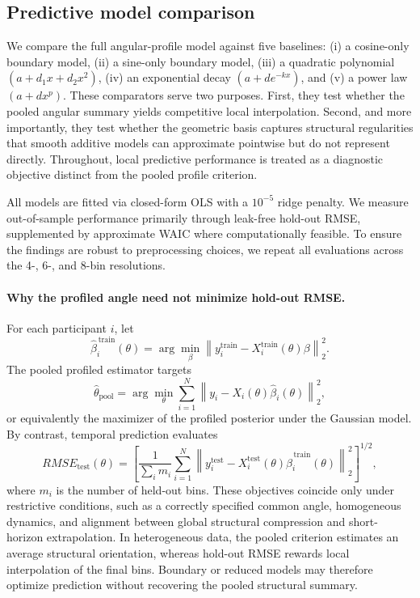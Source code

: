 \documentclass[12pt]{article}
\begin{document}
\subsection{Predictive model comparison}
We compare the full angular-profile model against five baselines: (i) a cosine-only boundary model, (ii) a sine-only boundary model, (iii) a quadratic polynomial $(a+d_1x+d_2x^2)$, (iv) an exponential decay $(a+de^{-kx})$, and (v) a power law $(a+dx^p)$. These comparators serve two purposes. First, they test whether the pooled angular summary yields competitive local interpolation. Second, and more importantly, they test whether the geometric basis captures structural regularities that smooth additive models can approximate pointwise but do not represent directly. Throughout, local predictive performance is treated as a diagnostic objective distinct from the pooled profile criterion.

All models are fitted via closed-form OLS with a $10^{-5}$ ridge penalty. We measure out-of-sample performance primarily through leak-free hold-out RMSE, supplemented by approximate WAIC where computationally feasible. To ensure the findings are robust to preprocessing choices, we repeat all evaluations across the 4-, 6-, and 8-bin resolutions.

\paragraph{Why the profiled angle need not minimize hold-out RMSE.}
For each participant $i$, let
\[
\hat{\beta}_i^{\,\mathrm{train}}(\theta)
=
\arg\min_\beta
\left\|
y_i^{\mathrm{train}}-X_i^{\mathrm{train}}(\theta)\beta
\right\|_2^2.
\]
The pooled profiled estimator targets
\[
\hat{\theta}_{\mathrm{pool}}
=
\arg\min_\theta
\sum_{i=1}^N
\left\|
y_i-X_i(\theta)\hat{\beta}_i(\theta)
\right\|_2^2,
\]
or equivalently the maximizer of the profiled posterior under the Gaussian model. By contrast, temporal prediction evaluates
\[
RMSE_{\mathrm{test}}(\theta)
=
\left[
\frac{1}{\sum_i m_i}
\sum_{i=1}^N
\left\|
y_i^{\mathrm{test}}-
X_i^{\mathrm{test}}(\theta)\hat{\beta}_i^{\,\mathrm{train}}(\theta)
\right\|_2^2
\right]^{1/2},
\]
where $m_i$ is the number of held-out bins. These objectives coincide only under restrictive conditions, such as a correctly specified common angle, homogeneous dynamics, and alignment between global structural compression and short-horizon extrapolation. In heterogeneous data, the pooled criterion estimates an average structural orientation, whereas hold-out RMSE rewards local interpolation of the final bins. Boundary or reduced models may therefore optimize prediction without recovering the pooled structural summary.
\end{document}
